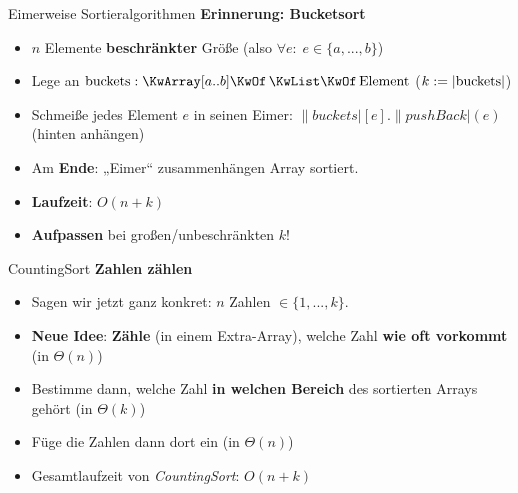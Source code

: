 




\morescalingdelimiters


	
	
	
\begin{frame}{Eimerweise Sortieralgorithmen}
	\textbf{Erinnerung: Bucketsort} 
	\begin{itemize}
		\item $n$ Elemente \textbf{beschränkter} Größe (also $\forall e : \; e \in \{a, ..., b\} $)
		\item Lege an \: $\|buckets|: \KwArray[a..b] \KwOf \KwListOf \|Element|$ \quad ($k := \abs{\|buckets|}$)
		\item Schmeiße jedes Element $e$ in seinen Eimer: $\|buckets|[e].\|pushBack|(e)$ (hinten anhängen)
		\item Am \textbf{Ende}: „Eimer“ zusammenhängen
		\implitem Array sortiert. 
		\item \textbf{Laufzeit}: $O(n+k)$
		\item \textbf{Aufpassen} bei großen/unbeschränkten $k$!
	\end{itemize}
\end{frame}

\begin{frame}{CountingSort}
	\textbf{Zahlen zählen} 
	\begin{itemize}
		\item Sagen wir jetzt ganz konkret: $n$ Zahlen $\in \{1,...,k\}$.
		\pause
		\item \textbf{Neue Idee}: \textbf{Zähle} (in einem Extra-Array), welche Zahl \textbf{wie oft vorkommt} (in $\Theta(n)$)
		\pause
		\item Bestimme dann, welche Zahl \textbf{in welchen Bereich} des sortierten Arrays gehört (in $\Theta(k)$)
		\pause
		\item Füge die Zahlen dann dort ein (in $\Theta(n)$)
		\pause
		\item Gesamtlaufzeit von \emph{CountingSort}: $O(n + k)$
	\end{itemize}
\end{frame}

